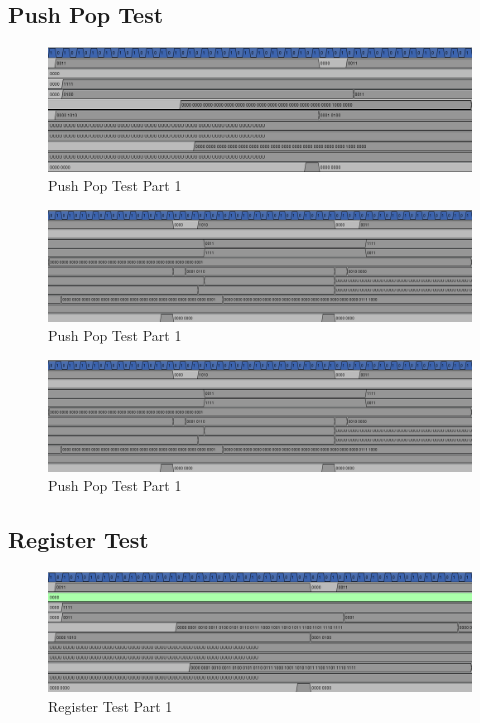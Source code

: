\subsection*{Push Pop Test}
\begin{figure}[!ht]
    \centering
    \includegraphics[width=\textwidth]{Images/PP Test Part 1.png}
    \caption{Push Pop Test Part 1}
\end{figure}

\begin{figure}[!ht]
    \centering
    \includegraphics[width=\textwidth]{Images/PP Test Part 2.png}
    \caption{Push Pop Test Part 1}
\end{figure}

\begin{figure}[!ht]
    \centering
    \includegraphics[width=\textwidth]{Images/PP Test Part 3.png}
    \caption{Push Pop Test Part 1}
\end{figure}

\clearpage
\subsection*{Register Test}
\begin{figure}[!ht]
    \centering
    \includegraphics[width=\textwidth]{Images/Register Test Part 1.png}
    \caption{Register Test Part 1}
\end{figure}

